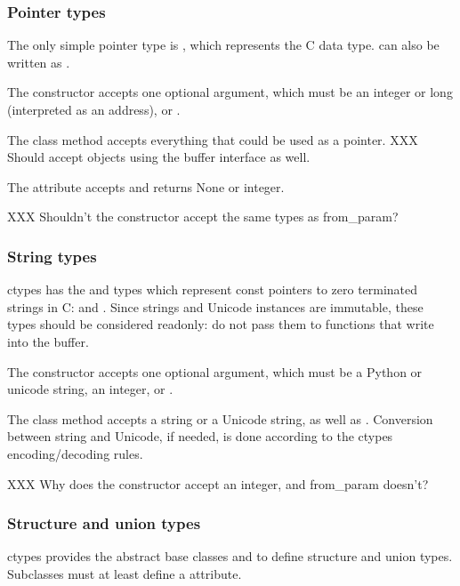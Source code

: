 \subsubsection{Pointer types\label{ctypes-pointer-types}}

The only simple pointer type is , which represents the C
 data type.   can also be written as
.

The constructor accepts one optional argument, which must be an
integer or long (interpreted as an address), or .

The  class method accepts everything that could be used
as a pointer.  XXX Should accept objects using the buffer interface as
well.

The  attribute accepts and returns None or integer.

XXX Shouldn't the constructor accept the same types as from{\_}param?


\subsubsection{String types\label{ctypes-string-types}}

ctypes has the  and  types which represent
const pointers to zero terminated strings in C:  and
.  Since strings and Unicode instances are
immutable, these types should be considered readonly: do not pass them
to functions that write into the buffer.

The constructor accepts one optional argument, which must be a Python
or unicode string, an integer, or .

The  class method accepts a string or a Unicode string,
as well as .  Conversion between string and Unicode, if
needed, is done according to the ctypes encoding/decoding rules.

XXX Why does the constructor accept an integer, and from{\_}param doesn't?


\subsubsection{Structure and union types\label{ctypes-structure-union-types}}

ctypes provides the abstract base classes  and 
to define structure and union types.  Subclasses must at least define
a  attribute.


